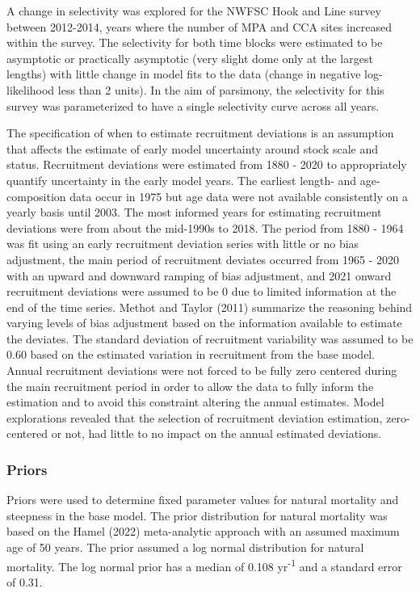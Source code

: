 \documentclass[11pt,
  english,
  letterpaper,
]{article}
\begin{document}
A change in selectivity was explored for the NWFSC Hook and Line survey between 2012-2014, years where the number of MPA and CCA sites increased within the survey. The selectivity for both time blocks were estimated to be asymptotic or practically asymptotic (very slight dome only at the largest lengths) with little change in model fits to the data (change in negative log-likelihood less than 2 units). In the aim of parsimony, the selectivity for this survey was parameterized to have a single selectivity curve across all years.

The specification of when to estimate recruitment deviations is an assumption that affects the estimate of early model uncertainty around stock scale and status. Recruitment deviations were estimated from 1880 - 2020 to appropriately quantify uncertainty in the early model years. The earliest length- and age-composition data occur in 1975 but age data were not available consistently on a yearly basis until 2003. The most informed years for estimating recruitment deviations were from about the mid-1990s to 2018. The period from 1880 - 1964 was fit using an early recruitment deviation series with little or no bias adjustment, the main period of recruitment deviates occurred from 1965 - 2020 with an upward and downward ramping of bias adjustment, and 2021 onward recruitment deviations were assumed to be 0 due to limited information at the end of the time series. Methot and Taylor (2011) summarize the reasoning behind varying levels of bias adjustment based on the information available to estimate the deviates. The standard deviation of recruitment variability was assumed to be 0.60 based on the estimated variation in recruitment from the base model. Annual recruitment deviations were not forced to be fully zero centered during the main recruitment period in order to allow the data to fully inform the estimation and to avoid this constraint altering the annual estimates. Model explorations revealed that the selection of recruitment deviation estimation, zero-centered or not, had little to no impact on the annual estimated deviations.

\hypertarget{priors}{%
\subsubsection{Priors}\label{priors}}

Priors were used to determine fixed parameter values for natural mortality and steepness in the base model. The prior distribution for natural mortality was based on the Hamel (2022) meta-analytic approach with an assumed maximum age of 50 years. The prior assumed a log normal distribution for natural mortality. The log normal prior has a median of 0.108 yr\textsuperscript{-1} and a standard error of 0.31.
\end{document}
